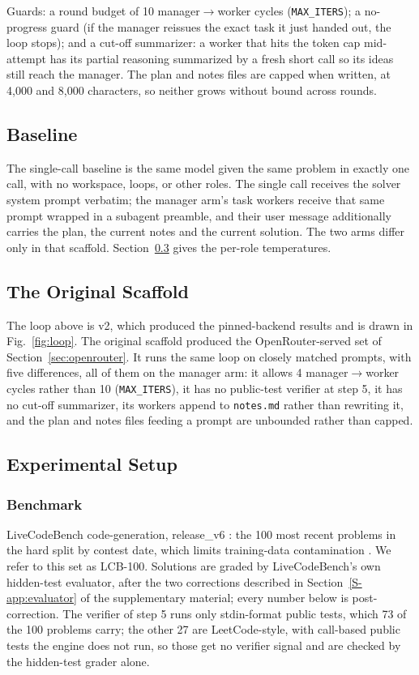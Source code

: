 \documentclass[journal]{IEEEtran}
\begin{document}
Guards: a round budget of 10 manager$\to$worker cycles
(\texttt{MAX\_ITERS}); a no-progress guard (if the manager reissues the exact task it just
handed out, the loop stops); and a cut-off summarizer: a worker that hits the token cap
mid-attempt has its partial reasoning summarized by a fresh short call so its ideas still
reach the manager. The plan and notes files are capped when written, at 4,000 and 8,000
characters, so neither grows without bound across rounds.

\subsection{Baseline}
\label{sec:baseline}

The single-call baseline is the same model given the same problem in exactly one call, with no
workspace, loops, or other roles. The single call receives the solver
system prompt verbatim; the manager arm's task workers receive that same prompt wrapped in a
subagent preamble, and their user message additionally
carries the plan, the current notes and the current solution. The two arms differ only in
that scaffold. Section~\ref{sec:setup} gives the per-role temperatures.

\subsection{The Original Scaffold}
\label{sec:scaffold-v1}

The loop above is v2, which produced the pinned-backend results and is drawn in
Fig.~\ref{fig:loop}. The original scaffold produced the OpenRouter-served set of
Section~\ref{sec:openrouter}. It runs the same loop on closely matched prompts, with five
differences, all of them on the manager arm: it allows 4 manager$\to$worker cycles rather than 10
(\texttt{MAX\_ITERS}), it has no public-test verifier at step 5, it has no cut-off summarizer, its
workers append to \texttt{notes.md} rather than rewriting it, and the plan and notes files feeding
a prompt are unbounded rather than capped.

\subsection{Experimental Setup}
\label{sec:setup}

\subsubsection{Benchmark} LiveCodeBench code-generation, release\_v6 \cite{jain2024}: the 100
most recent problems in the hard split by contest date, which limits training-data
contamination \cite{jain2024}. We refer to this set as LCB-100. Solutions are graded by
LiveCodeBench's own hidden-test evaluator, after the two corrections described in
Section~\ref{S-app:evaluator} of the supplementary material; every number below is post-correction. The verifier of step 5
runs only stdin-format public tests, which 73 of the 100 problems carry; the other 27 are
LeetCode-style, with call-based public tests the engine does not run, so those get no verifier
signal and are checked by the hidden-test grader alone.
\end{document}
